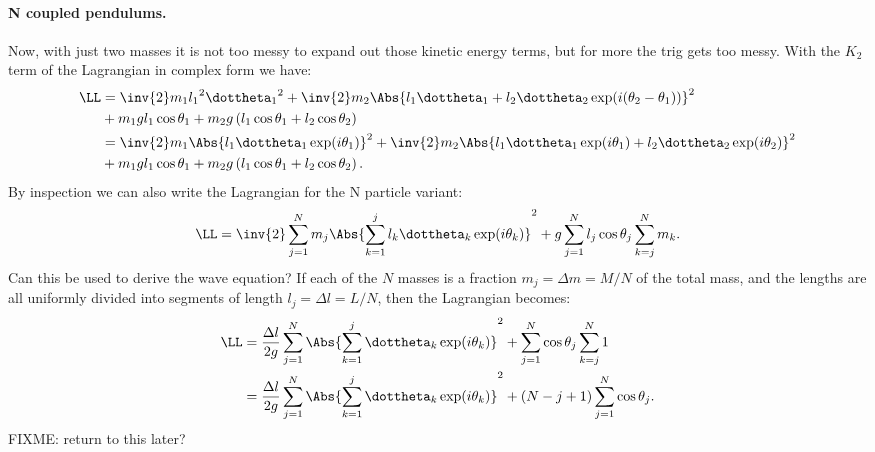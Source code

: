 {\paragraph{N coupled pendulums.}
%
Now, with just two masses it is not too messy to expand out those kinetic energy terms, but for more the trig gets too messy.  With the \(K_2\) term of the Lagrangian in complex form we have:
%
\begin{equation}\label{eqn:tongMf1:320}
\begin{aligned}
\LL
&=
\inv{2} m_1 {l_1}^2 {\dottheta_1}^2
+ \inv{2} m_2 \Abs{ l_1 \dottheta_1 + l_2 \dottheta_2 \exp(i(\theta_2 -\theta_1)) }^2 \\
&+ m_1 g l_1 \cos\theta_1 + m_2 g \left( l_1 \cos\theta_1 + l_2 \cos\theta_2 \right) \\
&=
\inv{2} m_1 \Abs{l_1 \dottheta_1 \exp(i\theta_1)}^2
+ \inv{2} m_2 \Abs{ l_1 \dottheta_1 \exp(i\theta_1) + l_2 \dottheta_2 \exp(i\theta_2) }^2 \\
&+ m_1 g l_1 \cos\theta_1 + m_2 g \left( l_1 \cos\theta_1 + l_2 \cos\theta_2 \right) .
\end{aligned}
\end{equation}
%
By inspection we can also write the Lagrangian for the N particle variant:
%
\begin{equation}\label{eqn:tongMf1:1280}
\LL
=
\inv{2} \sum_{j=1}^N m_j \Abs{ \sum_{k=1}^j l_k \dottheta_k \exp(i\theta_k) }^2
+ g \sum_{j=1}^N l_j \cos\theta_j \sum_{k=j}^N m_k.
\end{equation}
%
Can this be used to derive the wave equation?
%
If each of the \(N\) masses is a fraction \(m_j = \Delta m = M/N\) of the total mass, and the lengths are all uniformly divided into segments of length
\(l_j = \Delta l = L/N\), then the Lagrangian becomes:
%
\begin{equation}\label{eqn:tongMf1:340}
\begin{aligned}
\LL
&= \frac{\Delta l}{2g} \sum_{j=1}^N \Abs{ \sum_{k=1}^j \dottheta_k \exp(i\theta_k) }^2 + \sum_{j=1}^N \cos\theta_j \sum_{k=j}^N 1 \\
&= \frac{\Delta l}{2g} \sum_{j=1}^N \Abs{ \sum_{k=1}^j \dottheta_k \exp(i\theta_k) }^2 + ( N - j + 1 ) \sum_{j=1}^N \cos\theta_j .
\end{aligned}
\end{equation}
%
FIXME: return to this later?
}
